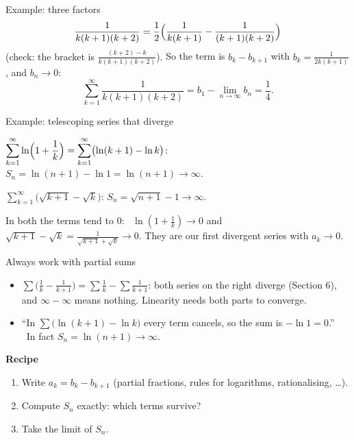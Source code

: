 \documentclass[10pt]{wosm-slides}
\begin{document}
\begin{frame}{Example: three factors}
  \[ \frac{1}{k(k+1)(k+2)} = \frac12\Bigl(\frac{1}{k(k+1)} - \frac{1}{(k+1)(k+2)}\Bigr) \]
  {\small (check: the bracket is $\frac{(k+2) - k}{k(k+1)(k+2)}$).}
  \pause
  So the term is $b_k - b_{k+1}$ with $b_k = \frac{1}{2k(k+1)}$, and $b_n \to 0$:
  \[ \sum_{k=1}^\infty \frac{1}{k(k+1)(k+2)} = b_1 - \lim_{n\to\infty} b_n = \frac14 . \]
\end{frame}

\begin{frame}{Example: telescoping series that diverge}
  \begin{example}
    $\displaystyle\sum_{k=1}^\infty \ln\Bigl(1 + \frac1k\Bigr)
      = \sum_{k=1}^\infty \bigl(\ln(k+1) - \ln k\bigr)$:
    \quad $S_n = \ln(n+1) - \ln 1 = \ln(n+1) \to \infty$.
  \end{example}
  \pause
  \begin{example}
    $\displaystyle\sum_{k=1}^\infty \bigl(\sqrt{k+1} - \sqrt{k}\bigr)$:
    \quad $S_n = \sqrt{n+1} - 1 \to \infty$.
  \end{example}
  \pause
  In both the terms tend to $0$: \ $\ln(1 + \frac1k) \to 0$ and
  $\sqrt{k+1} - \sqrt{k} = \frac{1}{\sqrt{k+1} + \sqrt{k}} \to 0$.
  They are our first divergent series with $a_k \to 0$.
\end{frame}

\begin{frame}{Always work with partial sums}
  \begin{warning}
    \begin{itemize}
      \item $\sum \bigl(\frac1k - \frac1{k+1}\bigr) = \sum \frac1k - \sum \frac1{k+1}$:
        both series on the right diverge (Section 6), and $\infty - \infty$ means nothing.
        Linearity needs both parts to converge.
      \item ``In $\sum \bigl(\ln(k+1) - \ln k\bigr)$ every term cancels, so the sum is
        $-\ln 1 = 0$.'' \ In fact $S_n = \ln(n+1) \to \infty$.
    \end{itemize}
  \end{warning}
  \pause
  \textbf{Recipe}
  \begin{enumerate}
    \item Write $a_k = b_k - b_{k+1}$ (partial fractions, rules for logarithms,
      rationalising, \dots).
    \item Compute $S_n$ exactly: which terms survive?
    \item Take the limit of $S_n$.
  \end{enumerate}
\end{frame}
\end{document}
